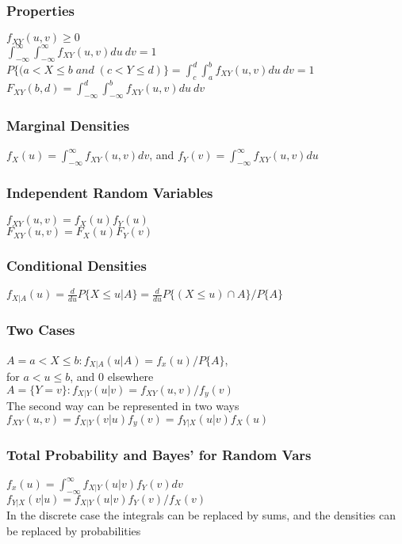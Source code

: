 \subsubsection*{Properties}
$f_{XY}(u,v) \geq 0$ \\
$\int_{-\infty}^{\infty}\int_{-\infty}^{\infty}f_{XY}(u,v)du\: dv = 1$ \\
$P\{(a<X\leq b \; and \;(c<Y\leq d)\} = \int_{c}^{d}\int_{a}^{b}f_{XY}(u,v)du\: dv = 1$ \\
$F_{XY}(b,d)=\int_{-\infty}^{d}\int_{-\infty}^{b}f_{XY}(u,v)du\: dv$

\subsubsection*{Marginal Densities}
$f_X(u)=\int_{-\infty}^{\infty}f_{XY}(u,v)dv$, and $f_Y(v)=\int_{-\infty}^{\infty}f_{XY}(u,v)du$

\subsubsection*{Independent Random Variables}
$f_{XY}(u,v) = f_X(u)f_Y(u)$ \\
$F_{XY}(u,v)=F_X(u)F_Y(v)$

\subsubsection*{Conditional Densities}
$f_{X|A}(u)=\frac{d}{du}P\{X\leq u|A\}=\frac{d}{du}P\{(X\leq u) \cap A\}/P\{A\} $

\subsubsection*{Two Cases}
$A={a<X\leq b}:f_{X|A}(u|A)=f_x(u)/P\{A\}$, \\ for $a<u\leq b$, and $0$ elsewhere \\
$A=\{Y=v\}:f_{X|Y}(u|v)=f_{XY}(u,v)/f_y(v)$ \\
The second way can be represented in two ways \\
$f_{XY}(u,v)=f_{X|Y}(v|u)f_y(v)=f_{Y|X}(u|v)f_X(u)$

\subsubsection*{Total Probability and Bayes' for Random Vars}
$f_x(u)=\int_{-\infty}^{\infty}f_{X|Y}(u|v)f_Y(v)dv$ \\
$f_{Y|X}(v|u)=f_{X|Y}(u|v)f_Y(v)/f_X(v)$ \\
In the discrete case the integrals can be replaced by sums, and the densities can be replaced by probabilities

